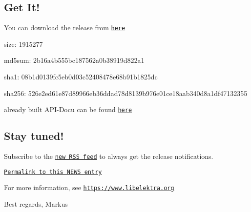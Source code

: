 \subsection*{Get It!}

You can download the release from \href{http://www.markus-raab.org/ftp/elektra/releases/elektra-0.8.10.tar.gz}{\tt here}


\begin{DoxyItemize}
\item size\+: 1915277
\item md5sum\+: 2b16a4b555bc187562a0b38919d822a1
\item sha1\+: 08b1d0139fc5eb0d03c52408478e68b91b1825dc
\item sha256\+: 526e2ed61e87d89966eb36ddad78d8139b976e01ce18aab340d8a1df47132355
\end{DoxyItemize}

already built A\+P\+I-\/\+Docu can be found \href{https://doc.libelektra.org/api/0.8.10/html/}{\tt here}

\subsection*{Stay tuned!}

Subscribe to the \href{https://doc.libelektra.org/news/feed.rss}{\tt new R\+SS feed} to always get the release notifications.

\href{https://doc.libelektra.org/news/6ce57ecf-420a-4a31-821e-1c5fe5532eb4.html}{\tt Permalink to this N\+E\+WS entry}

For more information, see \href{https://www.libelektra.org}{\tt https\+://www.\+libelektra.\+org}

Best regards, Markus 